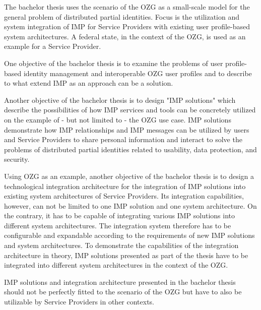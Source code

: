 The bachelor thesis uses the scenario of the OZG as a small-scale model for the general problem of distributed partial identities. Focus is the utilization and system integration of IMP for Service Providers with existing user profile-based system architectures. A federal state, in the context of the OZG, is used as an example for a Service Provider.

One objective of the bachelor thesis is to examine the problems of user profile-based identity management and interoperable OZG user profiles and to describe to what extend IMP as an approach can be a solution.

Another objective of the bachelor thesis is to design "IMP solutions" which describe the possibilities of how IMP services and tools can be concretely utilized on the example of - but not limited to - the OZG use case. IMP solutions demonstrate how IMP relationships and IMP messages can be utilized by users and Service Providers to share personal information and interact to solve the problems of distributed partial identities related to usability, data protection, and security.

Using OZG as an example, another objective of the bachelor thesis is to design a technological integration architecture for the integration of IMP solutions into existing system architectures of Service Providers. Its integration capabilities, however, can not be limited to one IMP solution and one system architecture. On the contrary, it has to be capable of integrating various IMP solutions into different system architectures. The integration system therefore has to be configurable and expandable according to the requirements of new IMP solutions and system architectures. To demonstrate the capabilities of the integration architecture in theory, IMP solutions presented as part of the thesis have to be integrated into different system architectures in the context of the OZG.

IMP solutions and integration architecture presented in the bachelor thesis should not be perfectly fitted to the scenario of the OZG but have to also be utilizable by Service Providers in other contexts.